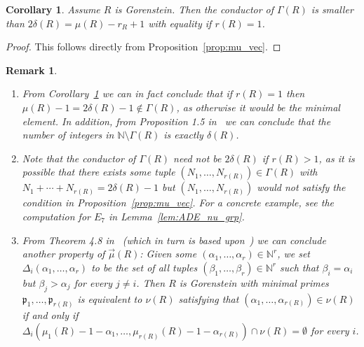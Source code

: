 \documentclass{article}
\newtheorem{remark}[theorem]{Remark}
\newtheorem{corollary}[theorem]{Corollary}
\numberwithin{theorem}{section}
\begin{document}
\begin{corollary}\label{cor:Gamma_cond}
    Assume $R$ is Gorenstein. Then the conductor of $\Gamma(R)$ is smaller than $2\delta(R) = \mu(R)-r_R+1$ with equality if $r(R)=1$. 
\end{corollary}

\begin{proof}
    This follows directly from Proposition~\ref{prop:mu_vec}.
\end{proof}


\begin{remark}\label{rem:mu-r(R)-gamma}
\begin{enumerate}
    \item \textup{From Corollary~\ref{cor:Gamma_cond} we can in fact conclude that if $r(R)=1$ then $\mu(R)-1=2 \delta(R)-1 \notin \Gamma(R)$, as otherwise it would be the minimal element. In addition, from Proposition 1.5 in~\cite{barroso2012approach} we can conclude that the number of integers in $\mathbb{N} \setminus \Gamma(R)$ is exactly $\delta(R)$.}
    \item \textup{Note that the conductor of $\Gamma(R)$ need not be $2\delta(R)$ if $r(R)>1$, as it is possible that there exists some tuple $(N_1, \dots, N_{r(R)}) \in \Gamma(R)$ with $N_1 + \cdots + N_{r(R)} = 2\delta(R)-1$  but $(N_1, \dots, N_{r(R)})$ would not satisfy the condition in Proposition~\ref{prop:mu_vec}. For a concrete example, see the computation for $E_7$ in Lemma~\ref{lem:ADE_nu_grp}.}
    \item \textup{From Theorem 4.8 in~\cite{campillo1994gorenstein} (which in turn is based upon~\cite{de1988gorenstein}) we can conclude another  property of $\vec{\mu}(R)$: Given some $ (\alpha_1, \dots, \alpha_r) \in \mathbb{N}^r$, we set $\Delta_i(\alpha_1, \dots, \alpha_r)$ to be the set of all tuples $(\beta_1, \dots, \beta_r) \in \mathbb{N}^r$ such that $\beta_i = \alpha_i$ but $\beta_j >\alpha_j$ for every $j \neq i$. Then $R$ is Gorenstein with minimal primes $\mathfrak{p}_1, \dots, \mathfrak{p}_{r(R)}$ is equivalent to $\nu(R)$ satisfying that $(\alpha_1, \dots, \alpha_{r(R)}) \in \nu(R)$ if and only if $\Delta_i\left(\mu_1(R)-1-\alpha_1, \dots, \mu_{r(R)}(R)-1-\alpha_{r(R)} \right) \cap \nu(R) = \emptyset$ for every $i$. }
\end{enumerate}


\end{remark}
\end{document}
